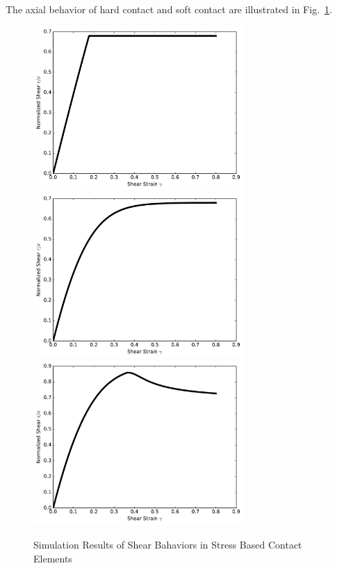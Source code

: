 The axial behavior of hard contact and soft contact are illustrated in Fig.~\ref{fig_soft_hard_contact_shear}.


\begin{figure}[H]
  \centering
  \includegraphics[width = 8cm]{./Figure-files/Day3/Contact_Examples/shear_perfectly_plastic.pdf}
  \includegraphics[width = 8cm]{./Figure-files/Day3/Contact_Examples/shear_hard.pdf}
  \includegraphics[width = 8cm]{./Figure-files/Day3/Contact_Examples/shear_hard_soft.pdf}
  \caption{Simulation Results of Shear Bahaviors in Stress Based Contact Elements}
  \label{fig_soft_hard_contact_shear}
\end{figure}






